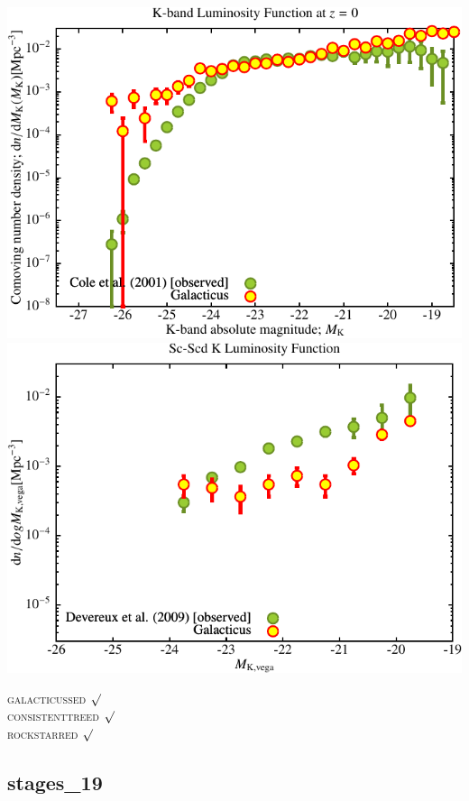 \includegraphics[scale=0.6]{stages_18/Plot_K_Luminosity_Function.pdf} \\
\includegraphics[scale=0.6]{stages_18/Plot_Morphological_Luminosity_Function6.pdf}

\textsc{galacticussed} $\surd$ \\
\textsc{consistenttreed} $\surd$ \\ 
\textsc{rockstarred} $\surd$

% 
%
%
%
%
%
%
%

\newpage
\subsection{stages\_19}

